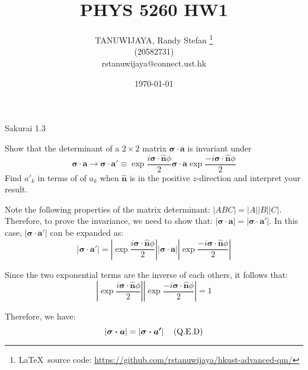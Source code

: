 \documentclass{article}
\title{PHYS 5260 HW1}
\author{TANUWIJAYA, Randy Stefan \footnote{\LaTeX\ source code: \url{https://github.com/rstanuwijaya/hkust-advanced-qm/}}
\\ (20582731) \\ rstanuwijaya@connect.ust.hk}
\affil{Department of Physics - HKUST}
\date{\today}
\begin{document}
\maketitle
\begin{section}{Sakurai 1.3}
	\newcommand{\nhat}{\boldsymbol{\hat{n}}}
	\newcommand{\sigdotn}{\boldsymbol{\sigma \cdot \hat{n}}}

	Show that the determinant of a $2 \times 2$ matrix $\boldsymbol{\sigma \cdot a}$ is invariant under
	\begin{equation*}
		\boldsymbol{\sigma \cdot a} \rightarrow \boldsymbol{\sigma \cdot a'} \equiv
		\exp{{\frac{i \sigdotn \phi}{2}}}
		\boldsymbol{\sigma \cdot a}
		\exp{{\frac{-i \sigdotn \phi}{2}}}
	\end{equation*}
	Find $a'_k$ in terms of of $a_k$ when $\nhat$ is in the positive $z$-direction and interpret your result.
	\begin{tcolorbox}[breakable]
		Note the following properties of the matrix determinant: $|ABC| = |A||B||C|$. Therefore, to prove the invariance, we need to show that: $\left|\boldsymbol{\sigma \cdot a}\right| = \left|\boldsymbol{\sigma \cdot a'}\right|$. In this case, $\left|\boldsymbol{\sigma \cdot a'}\right|$ can be expanded as:
		\begin{equation*}
			\left|\boldsymbol{\sigma \cdot a'}\right| =
			\left|
			\exp{{\frac{i \sigdotn \phi}{2}}}
			\right|
			\left|
			\boldsymbol{\sigma \cdot a}
			\right|
			\left|
			\exp{{\frac{-i \sigdotn \phi}{2}}}
			\right|
		\end{equation*}

		Since the two exponential terms are the inverse of each others, it follows that:
		\begin{equation*}
			\left|
			\exp{{\frac{i \sigdotn \phi}{2}}}
			\right|
			\left|
			\exp{{\frac{-i \sigdotn \phi}{2}}}
			\right|
			= 1
		\end{equation*}

		Therefore, we have:
		\begin{equation*}
			\left|\boldsymbol{\sigma \cdot a}\right| =
			\left|
			\boldsymbol{\sigma \cdot a'}
			\right| \qed
		\end{equation*}


\end{tcolorbox}
\end{section}
\end{document}

